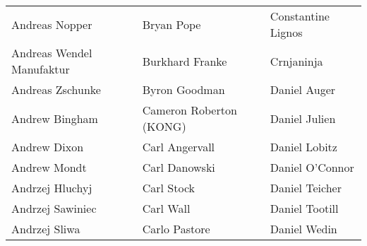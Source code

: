 \begin{tabular}{p{4.5cm}p{4.5cm}p{4.5cm}}
Andreas Nopper & Bryan Pope & Constantine Lignos \\
Andreas Wendel Manufaktur & Burkhard Franke & Crnjaninja \\
Andreas Zschunke & Byron Goodman & Daniel Auger \\
Andrew Bingham & Cameron Roberton (KONG) & Daniel Julien \\
Andrew Dixon & Carl Angervall & Daniel Lobitz \\
Andrew Mondt & Carl Danowski & Daniel O'Connor \\
Andrzej Hluchyj & Carl Stock & Daniel Teicher \\
Andrzej Sawiniec & Carl Wall & Daniel Tootill \\
Andrzej Sliwa & Carlo Pastore & Daniel Wedin \\
\end{tabular}
\newpage
\setlength{\tabcolsep}{1mm}
